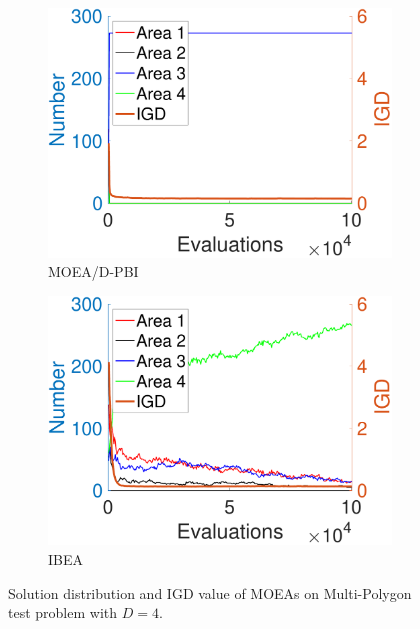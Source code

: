 \documentclass[conference]{IEEEtran}
\begin{document}
\begin{figure}[htbp]
\begin{subfigure}[b]{.22\textwidth}
    \end{subfigure}
    \begin{subfigure}[b]{.22\textwidth}
    \includegraphics[width=\linewidth]{Section5/dim4/Diversity/MOEAD_PBI}
    \caption{MOEA/D-PBI}
    \end{subfigure}
    \begin{subfigure}[b]{.22\textwidth}
    \includegraphics[width=\linewidth]{Section5/dim4/Diversity/IBEA}
    \caption{IBEA}
    \end{subfigure}

    \caption{Solution distribution and IGD value of MOEAs on Multi-Polygon test problem with $D=4$.}
    \label{fig: MOEAs Diversity dim=4}
\end{figure}
\end{document}
